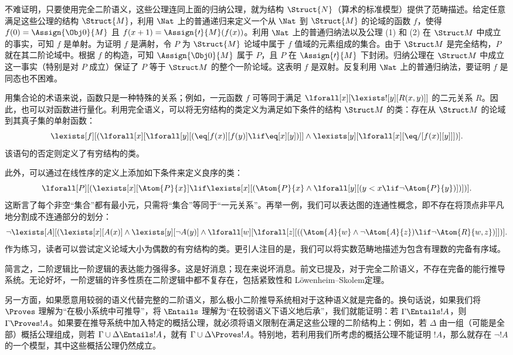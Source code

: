 \documentclass[../../../include/open-logic-section]{subfiles}
\begin{document}
不难证明，只要使用完全二阶语义，这些公理连同上面的归纳公理，就为结构 $\Struct{N}$（算术的标准模型）提供了范畴描述。给定任意满足这些公理的结构 $\Struct{M}$，利用 $\Nat$ 上的普通递归来定义一个从 $\Nat$ 到 $\Struct{M}$ 的论域的函数 $f$，使得 $f(0) = \Assign{\Obj 0}{M}$ 且 $f(x+1) = \Assign{\prime}{M}(f(x))$。利用 $\Nat$ 上的普通归纳法以及公理 (1) 和 (2) 在 $\Struct M$ 中成立的事实，可知 $f$ 是单射。为证明 $f$ 是满射，令 $P$ 为 $\Struct{M}$ 论域中属于 $f$ 值域的元素组成的集合。由于 $\Struct M$ 是完全结构，$P$ 就在其二阶论域中。根据 $f$ 的构造，可知 $\Assign{\Obj 0}{M}$ 属于 $P$，且 $P$ 在 $\Assign{\prime}{M}$ 下封闭。归纳公理在 $\Struct M$ 中成立这一事实（特别是对 $P$ 成立）保证了 $P$ 等于 $\Struct M$ 的整个一阶论域。这表明 $f$ 是双射。反复利用 $\Nat$ 上的普通归纳法，要证明 $f$ 是同态也不困难。

用集合论的术语来说，函数只是一种特殊的关系；例如，一元函数 $f$ 可等同于满足 $\lforall[x][\lexists![y][R(x,y)]]$ 的二元关系 $R$。因此，也可以对函数进行量化。利用完全语义，可以将无穷结构的类定义为满足如下条件的结构 $\Struct M$ 的类：存在从 $\Struct M$ 的论域到其真子集的单射函数：
\[
\lexists[f][(\lforall[x][\lforall[y][(\eq[f(x)][f(y)] \lif \eq[x][y])]]
  \land \lexists[y][\lforall[x][\eq/[f(x)][y]]])].
\]
该语句的否定则定义了有穷结构的类。

此外，可以通过在线性序的定义上添加如下条件来定义良序的类：
\[
\lforall[P][(\lexists[x][\Atom{P}{x}] \lif \lexists[x][(\Atom{P}{x}
    \land \lforall[y][(y < x \lif \lnot \Atom{P}{y})])])].
\]
这断言了每个非空“集合”都有最小元，只需将“集合”等同于“一元关系”。再举一例，我们可以表达图的连通性概念，即不存在将顶点非平凡地分割成不连通部分的划分：
\[
\lnot \lexists[A][(\lexists[x][A(x)] \land \lexists[y][\lnot A(y)]
  \land \lforall[w][\lforall[z][((\Atom{A}{w} \land \lnot \Atom{A}{z})
      \lif \lnot \Atom{R}{w,z})]])].
\]
作为练习，读者可以尝试定义论域大小为偶数的有穷结构的类。更引人注目的是，我们可以将实数范畴地描述为包含有理数的完备有序域。

简言之，二阶逻辑比一阶逻辑的表达能力强得多。这是好消息；现在来说坏消息。前文已提及，对于完全二阶语义，不存在完备的能行推导系统。无论好坏，一阶逻辑的许多性质在二阶逻辑中都不复存在，包括紧致性和 Löwenheim--Skolem定理。

另一方面，如果愿意用较弱的语义代替完整的二阶语义，那么极小二阶推导系统相对于这种语义就是完备的。换句话说，如果我们将 $\Proves$ 理解为“在极小系统中可推导”，将 $\Entails$ 理解为“在较弱语义下语义地后承”，我们就能证明：若 $\Gamma \Entails !A$，则 $\Gamma \Proves !A$。如果要在推导系统中加入特定的概括公理，就必须将语义限制在满足这些公理的二阶结构上：例如，若 $\Delta$ 由一组（可能是全部）概括公理组成，则若 $\Gamma \cup \Delta \Entails !A$，就有 $\Gamma \cup \Delta \Proves !A$。特别地，若利用我们所考虑的概括公理不能证明 $!A$，那么就存在 $\lnot !A$ 的一个模型，其中这些概括公理仍然成立。
\end{document}
